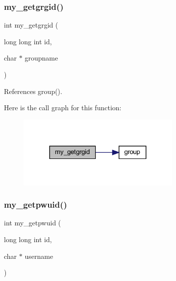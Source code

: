 \subsubsection{\texorpdfstring{my\+\_\+getgrgid()}{my\_getgrgid()}}
{\footnotesize\ttfamily int my\+\_\+getgrgid (\begin{DoxyParamCaption}\item[{long long int}]{id,  }\item[{char $\ast$}]{groupname }\end{DoxyParamCaption})}



References group().

Here is the call graph for this function\+:
\nopagebreak
\begin{figure}[H]
\begin{center}
\leavevmode
\includegraphics[width=227pt]{C-M__system_8c_a13b282e9de0dc0bb29bec1d76aaf6cf0_cgraph}
\end{center}
\end{figure}
\mbox{\label{C-M__system_8c_a0feb597a044e16699952e0056390f3d6}} 
\subsubsection{\texorpdfstring{my\+\_\+getpwuid()}{my\_getpwuid()}}
{\footnotesize\ttfamily int my\+\_\+getpwuid (\begin{DoxyParamCaption}\item[{long long int}]{id,  }\item[{char $\ast$}]{username }\end{DoxyParamCaption})}

\mbox{\label{C-M__system_8c_ab5188f2ca99719a14c77a1acae06f93a}} 

